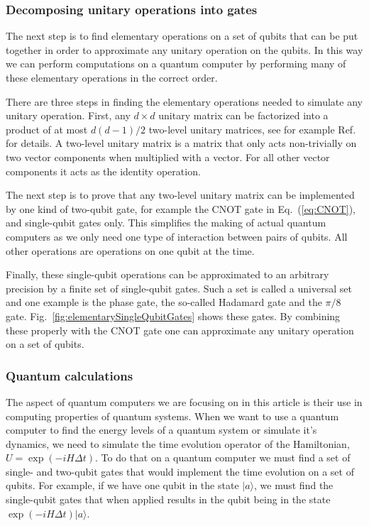 \documentclass[aps,pra,twocolumn,floatfix]{revtex4}
\begin{document}
\subsubsection{Decomposing unitary operations into gates}
The next step is to find elementary operations
on a set of qubits that can be put together in order to approximate any unitary
operation on the qubits. In this way we can perform computations on
a quantum computer by performing many of these elementary operations
in the correct order.

There are three steps in finding the elementary operations needed to
simulate any unitary operation.
First,  any
$d\times d$ unitary matrix can be factorized into a product of at most
$d(d-1)/2$ two-level unitary matrices, see for example Ref.~\cite{nielsen2000} for details. 
A two-level unitary matrix is a
matrix that only acts non-trivially on two vector components when
multiplied with a vector. For all other vector components it acts as
the identity operation. 

The next step is to prove that any two-level unitary matrix can be
implemented by one kind of two-qubit gate, for example the CNOT gate 
in Eq.~(\ref{eq:CNOT}), 
and single-qubit gates only. 
This simplifies the making of actual quantum
computers as we only need one type of interaction between pairs of
qubits. All other operations are operations on one qubit at the time. 

Finally,  these single-qubit operations can be approximated to an
arbitrary precision by a finite set of single-qubit gates. Such a set
is called a universal set and one example is the phase gate, the
so-called Hadamard gate and
the $\pi/8$ gate. Fig.~\ref{fig:elementarySingleQubitGates} shows these gates. 
By combining these properly 
with the CNOT gate one can approximate any unitary operation on a set
of qubits. 

\subsubsection{Quantum calculations}
The aspect of quantum computers we are focusing on in this article is
their use in computing properties of quantum systems. 
When we want to use a quantum computer to 
find the energy levels of a quantum system
or simulate it's dynamics, we need to simulate
the time evolution operator of the Hamiltonian, $U=\exp(-iH\Delta t)$.
To do that on a quantum computer we must find a set of single- and 
two-qubit gates that would implement the time evolution on a set of
qubits. For example, if we have one qubit in the state ${\ensuremath{|
    a\rangle}}$, we must find the single-qubit gates that when applied
results in the qubit being in the state
$\exp(-iH\Delta t)|a\rangle$. 
\end{document}

